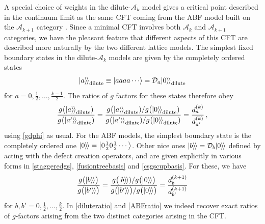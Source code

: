 A special choice of weights in the dilute-$\mathcal{A}_k$ model gives a critical point described in the continuum limit as the same CFT coming from the ABF model built on the $\mathcal{A}_{k+1}$ category \cite{Nienhuis1990,Warnaar1992}.
Since a minimal CFT involves both $\mathcal{A}_k$ and $\mathcal{A}_{k+1}$ categories, we have the pleasant feature that different aspects of this CFT are described more naturally by the two different lattice models.
The simplest fixed boundary states in the dilute-$\mathcal{A}_{k}$ models are given by the completely ordered states
\begin{align}
{|{a}\rangle\mkern-2mu\rangle}_{\rm dilute} \equiv \ket{aaaa\cdots} = \mathcal{D}_a {|{0}\rangle\mkern-2mu\rangle}_{\rm dilute}
\label{totallyfixed}
\end{align}
for $a=0, \frac12,\dots,\frac{k-1}{2}$.
The ratios of $g$ factors for these states therefore obey
\begin{align}
\frac{g\big({|{a}\rangle\mkern-2mu\rangle}_{\rm dilute})}{g\big({|{a'}\rangle\mkern-2mu\rangle}_{\rm dilute})} = \frac{g\big({|{a}\rangle\mkern-2mu\rangle}_{\rm dilute})/g\big({|{0}\rangle\mkern-2mu\rangle}_{\rm dilute})}{g\big({|{a'}\rangle\mkern-2mu\rangle}_{\rm dilute})/g\big({|{0}\rangle\mkern-2mu\rangle}_{\rm dilute})} =\frac{d_a^{(k)}}{d_{a'}^{(k)}}  \,,
\label{diluteratio}
\end{align}
using \eqref{gdphi} as usual.
For the ABF models, the simplest boundary state is the completely ordered one ${|{0}\rangle\mkern-2mu\rangle} = \Ket{0\frac12 0\frac12\cdots}$.
Other nice ones ${|{b}\rangle\mkern-2mu\rangle}=\mathcal{D}_b{|{0}\rangle\mkern-2mu\rangle}$ defined by acting with the defect creation operators, and are given explicitly in various forms in \eqref{staggeredgs}, \eqref{fusiontreebasis} and \eqref{csgscupbasis}. For these, we have 
\begin{align}
\frac{g\big({|{b}\rangle\mkern-2mu\rangle}\big)}{g\big({|{b'}\rangle\mkern-2mu\rangle}\big)} = \frac{g\big({|{b}\rangle\mkern-2mu\rangle})/g\big({|{0}\rangle\mkern-2mu\rangle}\big)}{g\big({|{b'}\rangle\mkern-2mu\rangle}\big)/g\big({|{0}\rangle\mkern-2mu\rangle}\big)} =\frac{d_b^{(k+1)}}{d_{b'}^{(k+1)}} 
\label{ABFratio}
\end{align}
for $b,b'=0, \frac12,\dots,\frac{k}{2}$.
In \eqref{diluteratio} and \eqref{ABFratio} we indeed recover exact ratios of $g$-factors arising from the two distinct categories arising in the CFT.

